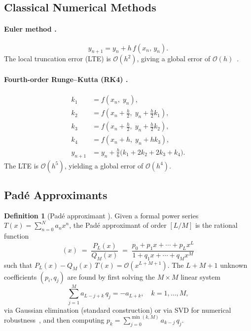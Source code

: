 \documentclass[12pt,a4paper]{article}
\theoremstyle{definition}
\newtheorem{definition}[theorem]{Definition}
\theoremstyle{remark}
\newcommand{\OO}{\mathcal{O}}
\begin{document}
\subsection{Classical Numerical Methods}

\paragraph{Euler method \cite{euler1768}.}
\begin{equation}
  y_{n+1} = y_n + h\,f(x_n,\,y_n).
  \label{eq:euler}
\end{equation}
The local truncation error (LTE) is $\OO(h^2)$, giving a global
error of $\OO(h)$~\cite{hairer1993}.

\paragraph{Fourth-order Runge--Kutta (RK4)
  \cite{runge1895,kutta1901,butcher1963}.}
\begin{equation}
  \begin{aligned}
    k_1 &= f(x_n,\;y_n),\\
    k_2 &= f\!\left(x_n + \tfrac{h}{2},\; y_n + \tfrac{h}{2}k_1\right),\\
    k_3 &= f\!\left(x_n + \tfrac{h}{2},\; y_n + \tfrac{h}{2}k_2\right),\\
    k_4 &= f(x_n + h,\; y_n + hk_3),\\
    y_{n+1} &= y_n + \frac{h}{6}\bigl(k_1 + 2k_2 + 2k_3 + k_4\bigr).
  \end{aligned}
  \label{eq:rk4}
\end{equation}
The LTE is $\OO(h^5)$, yielding a global error of $\OO(h^4)$.

\subsection{Padé Approximants}
\label{sec:pade_def}

\begin{definition}[Padé approximant {\cite{baker1996}}]
  \label{def:pade}
  Given a formal power series $T(x) = \sum_{n=0}^{N} a_n x^n$, the
  Padé approximant of order $[L/M]$ is the rational function
  \begin{equation}
    [L/M](x) \;=\; \frac{P_L(x)}{Q_M(x)}
    \;=\; \frac{p_0 + p_1 x + \cdots + p_L x^L}
               {1   + q_1 x + \cdots + q_M x^M}
    \label{eq:pade}
  \end{equation}
  such that $P_L(x) - Q_M(x)\,T(x) = \OO(x^{L+M+1})$.
  The $L + M + 1$ unknown coefficients $(p_i, q_j)$ are found by
  first solving the $M \times M$ linear system
  \begin{equation}
    \sum_{j=1}^{M} a_{L-j+k}\,q_j = -a_{L+k},
    \quad k = 1, \ldots, M,
    \label{eq:pade_sys}
  \end{equation}
  via Gaussian elimination (standard construction) or via SVD for
  numerical robustness~\cite{gonnet2013}, and then computing
  $p_k = \sum_{j=0}^{\min(k,M)} a_{k-j}\,q_j$.
\end{definition}
\end{document}
